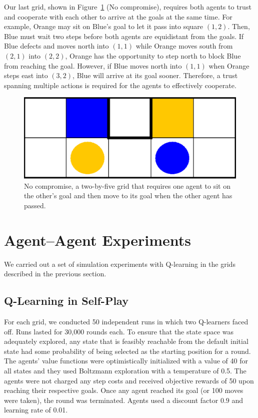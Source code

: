 \documentclass[letterpaper]{article}
\begin{document}
Our last grid, shown in Figure~\ref{fig:nocompromise} (No compromise),
requires both agents to trust and cooperate with each other to arrive
at the goals at the same time. For example, Orange may sit
on Blue's goal to let it pass into square $(1,2)$. Then, 
Blue must wait two steps before both agents are equidistant from
the goals. If Blue defects and moves north into $(1,1)$
while Orange moves south from $(2,1)$ into $(2,2)$, Orange
has the opportunity to step north to block Blue from reaching the
goal. However, if Blue moves north into $(1,1)$ when Orange steps east
into $(3,2)$, Blue will arrive at its goal sooner. Therefore, a trust
spanning multiple actions is required for the agents to effectively
cooperate.

\begin{figure}
\centering
\includegraphics[width=0.71\columnwidth]{figures/nocompromise.png}
\caption{No compromise, a two-by-five grid that requires one agent to
sit on the other's goal and then move to its goal when the other agent
has passed.}
\label{fig:nocompromise}
\end{figure}

\section{Agent--Agent Experiments}
We carried out a set of simulation experiments with Q-learning in
the grids described in the previous section.

\subsection{Q-Learning in Self-Play}


For each grid, we conducted 50 independent runs in which two
Q-learners faced off. Runs lasted for 30,000 rounds each. To ensure
that the state space was adequately explored, any state that is
feasibly reachable from the default initial state had some probability
of being selected as the starting position for a round. The agents'
value functions were optimistically initialized with a value of 40 for
all states and they used Boltzmann exploration with a temperature of
0.5. The agents were not charged any step costs and received objective
rewards of 50 upon reaching their respective goals. Once any agent
reached its goal (or 100 moves were taken), the round was terminated.
Agents used a discount factor $0.9$ and learning rate of 0.01.
\end{document}
